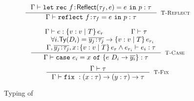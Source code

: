 \begin{figure}
$$
\inference
	{\hastype{\env}
	 				 {\eletb{f}{\exacttype{\gtyp_f}{e}}{e}{\prog}}
					 {\typ}
	}
	{\hastype{\env}
					 {\erefb{f}{\gtyp_f}{e}{\prog}}
					 {\typ}
	}[\rtreflect]
$$

$$
\inference{
	\hastype{\env}{e}{\tref{v}{T}{e_r}} & \iswellformed{\env}{\typ} \\
	& \forall i. \constty{\dc_i} = \tfunbasic{\overline{\tbind{y_j}{\typ_j}}}{\tref{v}{T}{e_{r_i}}} \\
	& \hastype{\env, \overline{\tbind{y_j}{\typ_j}}, \tbind{x}{\tref{v}{T}{e_r \land e_{r_i}}} }{e_i}{\typ}
}{
	\hastype{\env}{\ecase{x}{e}{\dc_i}{\overline{y_i}}{e_i}}{\typ}
}[\rtcase]
$$
$$
\inference{
	\iswellformed{\env}{\typ}
}{
	\hastype{\env}
	        {\efix{}}
	        {\tfun{x}{\typ}{\tfun{y}{\typ}{\typ}}}
}[\rtfix]
$$
\caption{Typing of \corelan}
\label{fig:typing}
\end{figure}
